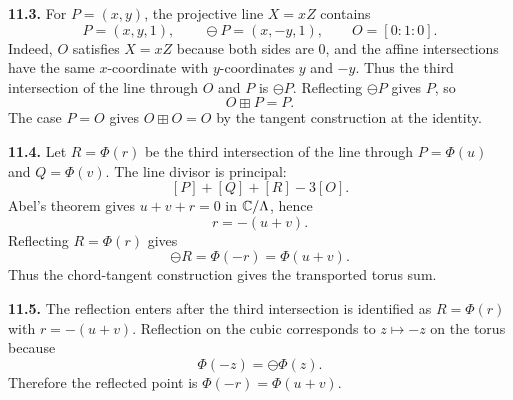 \textbf{11.3.} For \(P=(x,y)\), the projective line \(X=xZ\) contains
\[
  P=(x,y,1),\qquad \ominus P=(x,-y,1),\qquad O=[0:1:0].
\]
Indeed, \(O\) satisfies \(X=xZ\) because both sides are \(0\), and the affine
intersections have the same \(x\)-coordinate with \(y\)-coordinates \(y\) and
\(-y\).  Thus the third intersection of the line through \(O\) and \(P\) is
\(\ominus P\).  Reflecting \(\ominus P\) gives \(P\), so
\[
  O\boxplus P=P.
\]
The case \(P=O\) gives \(O\boxplus O=O\) by the tangent construction at the
identity.

\begin{center}
\end{center}

\textbf{11.4.} Let \(R=\Phi(r)\) be the third intersection of the line through
\(P=\Phi(u)\) and \(Q=\Phi(v)\).  The line divisor is principal:
\[
  [P]+[Q]+[R]-3[O].
\]
Abel's theorem gives \(u+v+r=0\) in \(\mathbb{C}/\Lambda\), hence
\[
  r=-(u+v).
\]
Reflecting \(R=\Phi(r)\) gives
\[
  \ominus R=\Phi(-r)=\Phi(u+v).
\]
Thus the chord-tangent construction gives the transported torus sum.

\begin{center}
\end{center}

\textbf{11.5.} The reflection enters after the third intersection is identified
as \(R=\Phi(r)\) with \(r=-(u+v)\).  Reflection on the cubic corresponds to
\(z\mapsto -z\) on the torus because
\[
  \Phi(-z)=\ominus\Phi(z).
\]
Therefore the reflected point is \(\Phi(-r)=\Phi(u+v)\).

